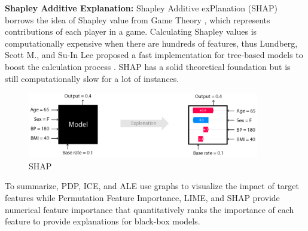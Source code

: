 \textbf{Shapley Additive Explanation: } Shapley Additive exPlanation (SHAP) borrows the idea of Shapley value from Game Theory \cite{shapley_1953}, which represents contributions of each player in a game. Calculating Shapley values is computationally expensive when there are hundreds of features, thus Lundberg, Scott M., and Su-In Lee proposed a fast implementation for tree-based models to boost the calculation process \cite{lundberg2017unified}. SHAP has a solid theoretical foundation but is still computationally slow for a lot of instances.

\begin{figure}[H]
\centering
\includegraphics[width=0.9\textwidth]{figures/chapter_defence/shap.png}
\caption{SHAP \cite{lundberg2017unified}}
\label{fig.shap}
\end{figure}

To summarize, PDP, ICE, and ALE use graphs to visualize the impact of target features while Permutation Feature Importance, LIME, and SHAP provide numerical feature importance that quantitatively ranks the importance of each feature to provide explanations for black-box models.




